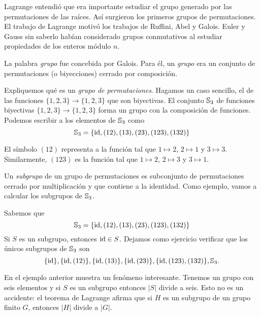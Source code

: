 Lagrange entendió que era importante estudiar el grupo generado por las
permutaciones de las raíces. Así surgieron los primeros 
grupos de permutaciones. 
El trabajo de Lagrange motivó los trabajos de Ruffini, Abel y Galois. 
Euler y Gauss sin saberlo habían considerado grupos conmutativos 
al estudiar propiedades de los enteros módulo $n$. 

La palabra
\emph{grupo} fue concebida por Galois. Para él, un \emph{grupo} era un
conjunto de permutaciones (o biyecciones) cerrado por composición. 

Expliquemos qué es un \emph{grupo de permutaciones}. Hagamos un caso sencillo, el de las funciones 
$\{1,2,3\}\to\{1,2,3\}$ que son biyectivas. El conjunto $\mathbb{S}_3$ de funciones
biyectivas $\{1,2,3\}\to\{1,2,3\}$ forma un grupo con la composición de funciones. Podemos escribir
a los elementos de $\mathbb{S}_3$ como
\[
	\mathbb{S}_3=\{\operatorname{id},(12),(13),(23),(123),(132)\}
\]

El símbolo $(12)$ representa a la función tal que $1\mapsto 2$, $2\mapsto 1$ y $3\mapsto 3$. Similarmente, $(123)$ es la función tal que $1\mapsto 2$, $2\mapsto 3$ y $3\mapsto 1$. 



Un \emph{subgrupo} de un grupo de permutaciones es subconjunto de permutaciones 
cerrado por multiplicación y 
que contiene a la identidad. Como ejemplo, vamos a calcular los subgrupos de $\mathbb{S}_3$.

\begin{example}
\label{exa:S3}
    Sabemos que 
    \[
	\mathbb{S}_3=\{\operatorname{id},(12),(13),(23),(123),(132)\}
    \]
    Si $S$ es un subgrupo, entonces $\operatorname{id}\in S$. Dejamos como ejercicio
    verificar que los únicos subgrupos de $\mathbb{S}_3$ son
    \[
    \{\operatorname{id}\},\{\operatorname{id},(12)\},\{\operatorname{id},(13)\},\{\operatorname{id},(23)\},\{\operatorname{id},(123),(132)\},\mathbb{S}_3.
    \]
\end{example}

En el ejemplo anterior muestra un fenómeno interesante. Tenemos un grupo con seis
elementos y si $S$ es un subgrupo entonces $|S|$ divide a seis. Esto no es un accidente:  
el teorema de Lagrange afirma que si $H$ es un subgrupo de un grupo finito $G$,
entonces $|H|$ divide a $|G|$. 

